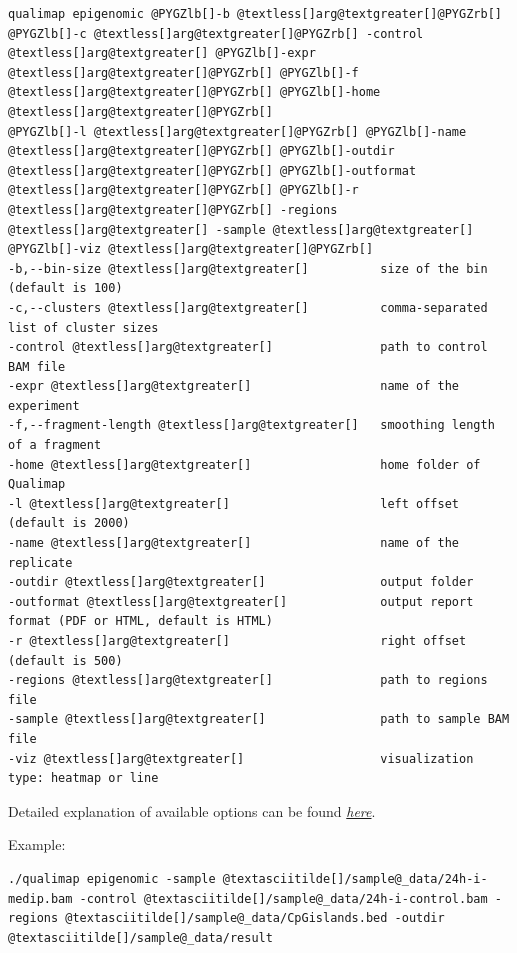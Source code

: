 \documentclass[a4paper,10pt,english]{sphinxmanual}
\begin{document}
\begin{Verbatim}[commandchars=@\[\]]
qualimap epigenomic @PYGZlb[]-b @textless[]arg@textgreater[]@PYGZrb[] @PYGZlb[]-c @textless[]arg@textgreater[]@PYGZrb[] -control @textless[]arg@textgreater[] @PYGZlb[]-expr @textless[]arg@textgreater[]@PYGZrb[] @PYGZlb[]-f @textless[]arg@textgreater[]@PYGZrb[] @PYGZlb[]-home @textless[]arg@textgreater[]@PYGZrb[]
@PYGZlb[]-l @textless[]arg@textgreater[]@PYGZrb[] @PYGZlb[]-name @textless[]arg@textgreater[]@PYGZrb[] @PYGZlb[]-outdir @textless[]arg@textgreater[]@PYGZrb[] @PYGZlb[]-outformat @textless[]arg@textgreater[]@PYGZrb[] @PYGZlb[]-r @textless[]arg@textgreater[]@PYGZrb[] -regions @textless[]arg@textgreater[] -sample @textless[]arg@textgreater[] @PYGZlb[]-viz @textless[]arg@textgreater[]@PYGZrb[]
-b,--bin-size @textless[]arg@textgreater[]          size of the bin (default is 100)
-c,--clusters @textless[]arg@textgreater[]          comma-separated list of cluster sizes
-control @textless[]arg@textgreater[]               path to control BAM file
-expr @textless[]arg@textgreater[]                  name of the experiment
-f,--fragment-length @textless[]arg@textgreater[]   smoothing length of a fragment
-home @textless[]arg@textgreater[]                  home folder of Qualimap
-l @textless[]arg@textgreater[]                     left offset (default is 2000)
-name @textless[]arg@textgreater[]                  name of the replicate
-outdir @textless[]arg@textgreater[]                output folder
-outformat @textless[]arg@textgreater[]             output report format (PDF or HTML, default is HTML)
-r @textless[]arg@textgreater[]                     right offset (default is 500)
-regions @textless[]arg@textgreater[]               path to regions file
-sample @textless[]arg@textgreater[]                path to sample BAM file
-viz @textless[]arg@textgreater[]                   visualization type: heatmap or line
\end{Verbatim}

\begin{DUlineblock}{0em}
\item[] 
\item[] Detailed explanation of available options can be found {\hyperref[analysis:epigenomic]{\emph{here}}}.
\end{DUlineblock}

Example:

\begin{Verbatim}[commandchars=@\[\]]
./qualimap epigenomic -sample @textasciitilde[]/sample@_data/24h-i-medip.bam -control @textasciitilde[]/sample@_data/24h-i-control.bam -regions @textasciitilde[]/sample@_data/CpGislands.bed -outdir @textasciitilde[]/sample@_data/result
\end{Verbatim}
\end{document}
